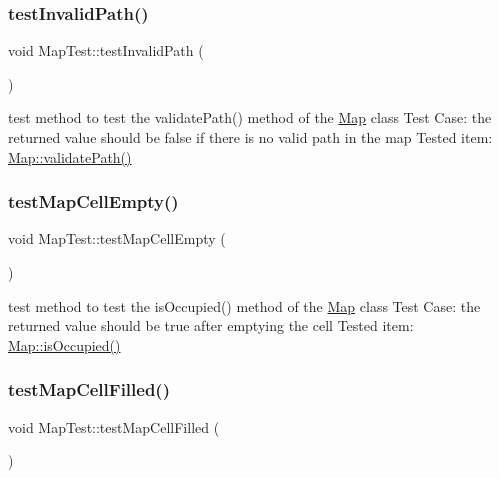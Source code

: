 \subsubsection{\texorpdfstring{test\+Invalid\+Path()}{testInvalidPath()}}
{\footnotesize\ttfamily void Map\+Test\+::test\+Invalid\+Path (\begin{DoxyParamCaption}{ }\end{DoxyParamCaption})\hspace{0.3cm}{\ttfamily [protected]}}

test method to test the validate\+Path() method of the \hyperlink{classMap}{Map} class Test Case\+: the returned value should be false if there is no valid path in the map Tested item\+: \hyperlink{classMap_a91d9e239a9871b99a5d6d2d5d46b0504}{Map\+::validate\+Path()} \hypertarget{classMapTest_a83bb3473f74089996c7f6bee8d59a97c}{}\label{classMapTest_a83bb3473f74089996c7f6bee8d59a97c} 
\subsubsection{\texorpdfstring{test\+Map\+Cell\+Empty()}{testMapCellEmpty()}}
{\footnotesize\ttfamily void Map\+Test\+::test\+Map\+Cell\+Empty (\begin{DoxyParamCaption}{ }\end{DoxyParamCaption})\hspace{0.3cm}{\ttfamily [protected]}}

test method to test the is\+Occupied() method of the \hyperlink{classMap}{Map} class Test Case\+: the returned value should be true after emptying the cell Tested item\+: \hyperlink{classMap_a79e5ced99d160ca9b680661169f16d84}{Map\+::is\+Occupied()} \hypertarget{classMapTest_a07e1aa96435351d15809b880ff7a7efb}{}\label{classMapTest_a07e1aa96435351d15809b880ff7a7efb} 
\subsubsection{\texorpdfstring{test\+Map\+Cell\+Filled()}{testMapCellFilled()}}
{\footnotesize\ttfamily void Map\+Test\+::test\+Map\+Cell\+Filled (\begin{DoxyParamCaption}{ }\end{DoxyParamCaption})\hspace{0.3cm}{\ttfamily [protected]}}

